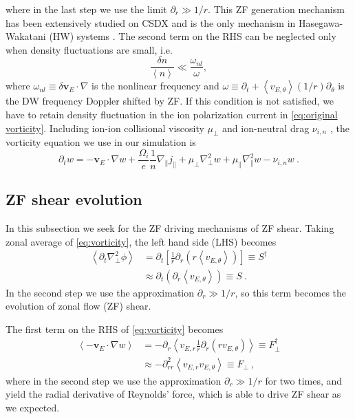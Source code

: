 \documentclass[aps,pre,twocolumn,superscriptaddress]{revtex4-2}
\begin{document}
where in the last step we use the limit $\partial_{r}\gg 1/r$. This ZF generation mechanism has been extensively studied on CSDX \cite{Holland_2006,Yan_2008,Yan_2010,Thakur_2018} and is the only mechanism in Hasegawa-Wakatani (HW) systems \cite{Hasegawa_1983,Hajjar_2018}. The second term on the RHS can be neglected only when density fluctuations are small, i.e.
\begin{equation}
	\frac{\delta n}{\left<n\right>}\ll\frac{\omega_{nl}}{\omega},
\end{equation}
where $\omega_{nl}\equiv\delta\bm{v}_E\cdot\nabla$ is the nonlinear frequency and $\omega\equiv\partial_{t}+\left<v_{E,\theta}\right>\left(1/r\right)\partial_{\theta}$ is the DW frequency Doppler shifted by ZF. If this condition is not satisfied, we have to retain density fluctuation in the ion polarization current in \cref{eq:original vorticity}. Including ion-ion collisional viscosity $\mu_{\perp}$ and ion-neutral drag $\nu_{i,n}$ \cite{Vaezi_2017U}, the vorticity equation we use in our simulation \cite{Lang_2019} is
\begin{equation}
	\partial_{t}w=-\bm{v}_{E}\cdot\nabla w
	+\frac{\Omega_{i}}{e}\frac{1}{n}\nabla_{\parallel}j_{\parallel}
	+\mu_{\perp}\nabla_{\perp}^2 w+\mu_{\parallel}\nabla_{\parallel}^2w
	-\nu_{i,n}w~.
\label{eq:vorticity}
\end{equation}

\subsection{\label{subsec: ZF shear evolution}ZF shear evolution}
In this subsection we seek for the ZF driving mechanisms of ZF shear. Taking zonal average of \cref{eq:vorticity}, the left hand side (LHS) becomes
\begin{equation}
\begin{aligned}
	\left<\partial_{t}\nabla_{\perp}^{2}\phi\right>
&=\partial_{t}\left[\frac{1}{r}\partial_{r}
\left(r\left<v_{E,\theta}\right>\right)\right]\equiv S^{\dagger} \\
&\approx\partial_{t}\left(\partial_{r}\left<v_{E,\theta}\right>\right)\equiv S~.
\label{eq:S}
\end{aligned}
\end{equation}
In the second step we use the approximation $\partial_{r}\gg 1/r$, so this term becomes the evolution of zonal flow (ZF) shear. 

The first term on the RHS of \cref{eq:vorticity} becomes 
\begin{equation}
\begin{aligned}
	\left<-\bm{v}_{E}\cdot\nabla w\right>
	&=-\partial_{r}\left<v_{E,r}\frac{1}{r}\partial_{r}
	\left(rv_{E,\theta}\right)\right>\equiv F_{\perp}^{\dagger} \\
	&\approx-\partial_{rr}^{2}\left<v_{E,r}v_{E,\theta}\right>\equiv F_{\perp}~,
\label{eq:Fperp}
\end{aligned}
\end{equation}
where in the second step we use the approximation $\partial_{r}\gg 1/r$ for two times, and yield the radial derivative of Reynolds' force, which is able to drive ZF shear as we expected. 
\end{document}
